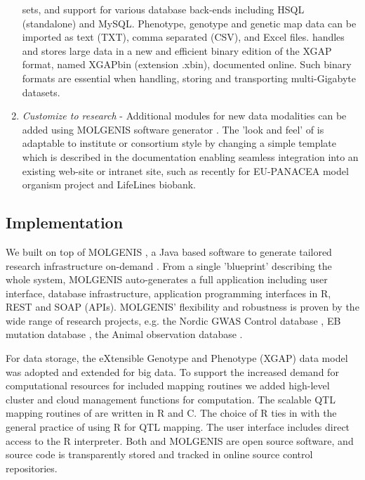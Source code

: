 \begin{enumerate}
sets, and support for various database back-ends including HSQL (standalone) and MySQL. Phenotype, 
genotype and genetic map data can be imported as text (TXT), comma separated (CSV), and Excel files. 
\xqtlwb handles and stores large data in a new and efficient binary edition of the XGAP format, named 
XGAPbin (extension .xbin), documented online. Such binary formats are essential when handling, storing 
and transporting multi-Gigabyte datasets.
\item \emph{Customize to research} - Additional modules for new data modalities can be added using 
MOLGENIS software generator \cite{Swertz:2010b}. The 'look and feel' of \xqtlwb is adaptable to 
institute or consortium style by changing a simple template which is described in the \xqtlwb 
documentation enabling seamless integration into an existing web-site or intranet site, such as 
recently for EU-PANACEA model organism project and LifeLines biobank.
\end{enumerate}

\subsection{Implementation}
We built \xqtlwb on top of MOLGENIS \cite{Swertz:2004}, a Java based software to generate tailored 
research infrastructure on-demand \cite{Swertz:2007}. From a single 'blueprint' describing the whole 
system, MOLGENIS auto-generates a full application including user interface, database infrastructure, 
application programming interfaces in R, REST and SOAP (APIs). MOLGENIS' flexibility and robustness 
is proven by the wide range of research projects, e.g. the Nordic GWAS Control database \cite{Leu:2010}, 
EB mutation database \cite{Akker:2011}, the Animal observation database \cite{Swertz:2010b}.

For data storage, the eXtensible Genotype and Phenotype (XGAP) data model was adopted \cite{Swertz:2010a} 
and extended for big data. To support the increased demand for computational resources for included 
mapping routines we added high-level cluster and cloud management functions for computation. The 
scalable QTL mapping routines of \xqtlwb are written in R and C. The choice of R ties in with the 
general practice of using R for QTL mapping. The user interface includes direct access to the R 
interpreter. Both \xqtlwb and MOLGENIS are open source software, and source code is transparently
stored and tracked in online source control repositories.

